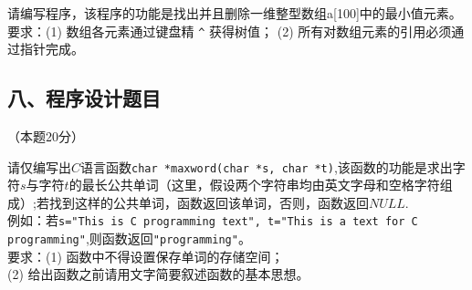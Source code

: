 请编写程序，该程序的功能是找出并且删除一维整型数组a[100]中的最小值元素。 \\
要求：(1) 数组各元素通过键盘精 \verb|^| 获得树值；
(2) 所有对数组元素的引用必须通过指针完成。

\subsection{八、程序设计题目}
（本题20分）

请仅编写出$C$语言函数\verb|char *maxword(char *s, char *t)|,该函数的功能是求出字符$s$与字符$t$的最长公共单词（这里，假设两个字符串均由英文字母和空格字符组成）;若找到这样的公共单词，函数返回该单词，否则，函数返回$NULL$. \\
例如：若\verb|s="This is C programming text", t="This is a text for C programming"|,则函数返回\verb|"programming"|。 \\
要求：(1) 函数中不得设置保存单词的存储空间； \\
     (2) 给出函数之前请用文字简要叙述函数的基本思想。

